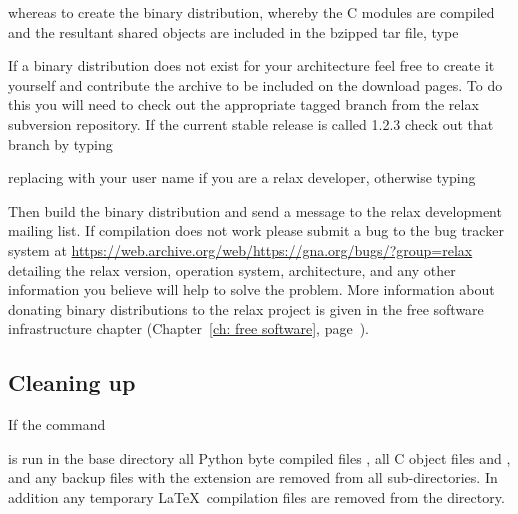 
whereas to create the binary distribution, whereby the C modules are compiled and the resultant shared objects are included in the bzipped tar file, type


If a binary distribution does not exist for your architecture feel free to create it yourself and contribute the archive to be included on the download pages.
To do this you will need to check out the appropriate tagged branch from the relax subversion repository.
If the current stable release is called 1.2.3 check out that branch by typing


replacing  with your user name if you are a relax developer, otherwise typing


Then build the binary distribution and send a message to the relax development mailing list.
If compilation does not work please submit a bug to the bug tracker system at \href{https://web.archive.org/web/https://gna.org/bugs/?group=relax}{https://web.archive.org/web/https://gna.org/bugs/?group=relax} detailing the relax version, operation system, architecture, and any other information you believe will help to solve the problem.
More information about donating binary distributions to the relax project is given in the free software infrastructure chapter (Chapter~\ref{ch: free software}, page~\pageref{ch: free software}).



\subsection{Cleaning up}

If the command


is run in the base directory all Python byte compiled files , all C object files  and , and any backup files with the extension  are removed from all sub-directories.
In addition any temporary \LaTeX\ compilation files are removed from the  directory.

